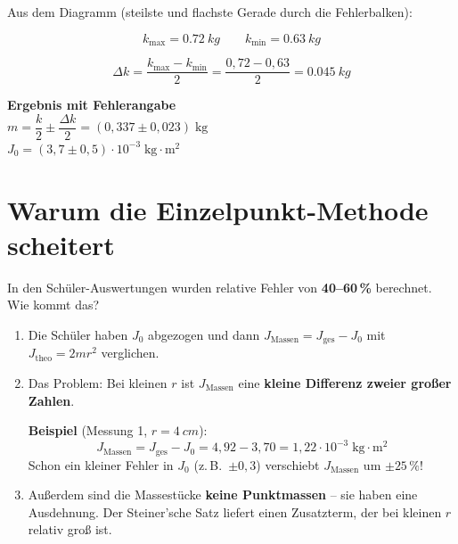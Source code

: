 \documentclass[11pt,a4paper]{scrartcl}
\begin{document}
Aus dem Diagramm (steilste und flachste Gerade durch die Fehlerbalken):

\[
k_\text{max} = \SI{0,72}{kg} \qquad k_\text{min} = \SI{0,63}{kg}
\]

\[
\Delta k = \frac{k_\text{max} - k_\text{min}}{2} = \frac{0{,}72 - 0{,}63}{2} = \SI{0,045}{kg}
\]

\begin{tcolorbox}[colback=yellow!10!white, colframe=yellow!50!black, width=\textwidth]
	\centering
	\textbf{Ergebnis mit Fehlerangabe}\\[0.4cm]
	{\Large $m = \dfrac{k}{2} \pm \dfrac{\Delta k}{2} = (0{,}337 \pm 0{,}023)\;\text{kg}$}\\[0.4cm]
	{\Large $J_0 = (3{,}7 \pm 0{,}5) \cdot 10^{-3}\;\text{kg}\cdot\text{m}^2$}
\end{tcolorbox}

\section*{Warum die Einzelpunkt-Methode scheitert}

In den Schüler-Auswertungen wurden relative Fehler von \textbf{40--60\,\%} berechnet. Wie kommt das?

\begin{enumerate}
	\item Die Schüler haben $J_0$ abgezogen und dann $J_\text{Massen} = J_\text{ges} - J_0$ mit $J_\text{theo} = 2mr^2$ verglichen.

	\item Das Problem: Bei kleinen $r$ ist $J_\text{Massen}$ eine \textbf{kleine Differenz zweier großer Zahlen}.

	\textbf{Beispiel} (Messung 1, $r = \SI{4}{cm}$):
	\[
	J_\text{Massen} = J_\text{ges} - J_0 = 4{,}92 - 3{,}70 = 1{,}22 \cdot 10^{-3}\;\text{kg}\cdot\text{m}^2
	\]
	Schon ein kleiner Fehler in $J_0$ (z.\,B.\ $\pm 0{,}3$) verschiebt $J_\text{Massen}$ um $\pm 25\,\%$!

	\item Außerdem sind die Massestücke \textbf{keine Punktmassen} -- sie haben eine Ausdehnung. Der Steiner'sche Satz liefert einen Zusatzterm, der bei kleinen $r$ relativ groß ist.
\end{enumerate}
\end{document}
